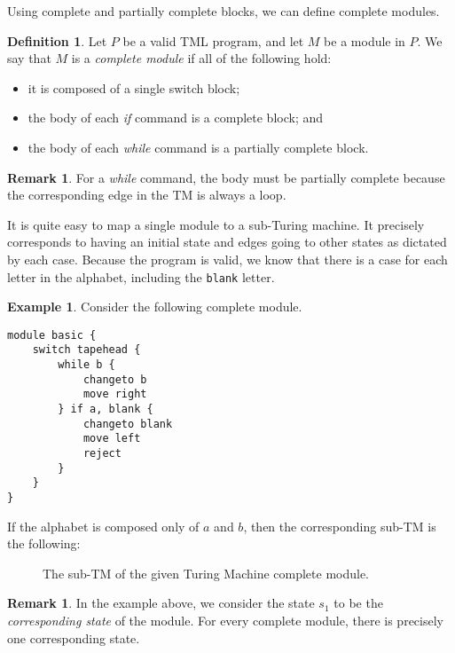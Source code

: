 \documentclass{article}
\theoremstyle{definition}
\newtheorem{definition}[theorem]{Definition}
\newtheorem{remark}[theorem]{Remark}
\newtheorem{example}[theorem]{Example}
\begin{document}
    Using complete and partially complete blocks, we can define complete modules.
    \begin{definition}
        Let $P$ be a valid TML program, and let $M$ be a module in $P$. We say that $M$ is a \emph{complete module} if all of the following hold:
        \begin{itemize}
            \item it is composed of a single switch block;
            \item the body of each \textit{if} command is a complete block; and
            \item the body of each \textit{while} command is a partially complete block.
        \end{itemize}
    \end{definition}
    \begin{remark}
        For a \textit{while} command, the body must be partially complete because the corresponding edge in the TM is always a loop.
    \end{remark}
    It is quite easy to map a single module to a sub-Turing machine. It precisely corresponds to having an initial state and edges going to other states as dictated by each case. Because the program is valid, we know that there is a case for each letter in the alphabet, including the \texttt{blank} letter.
    \begin{example}
        Consider the following complete module.
\begin{lstlisting}[language=TML]
module basic {
    switch tapehead {
        while b {
            changeto b
            move right
        } if a, blank {
            changeto blank
            move left
            reject
        }
    }
}
\end{lstlisting}
    If the alphabet is composed only of $a$ and $b$, then the corresponding sub-TM is the following:
    \begin{figure}[H]
        \centering
        \caption{The sub-TM of the given Turing Machine complete module.}
    \end{figure}
    \end{example}
    \begin{remark}
        In the example above, we consider the state $s_1$ to be the \emph{corresponding state} of the module. For every complete module, there is precisely one corresponding state.
    \end{remark}
\end{document}
